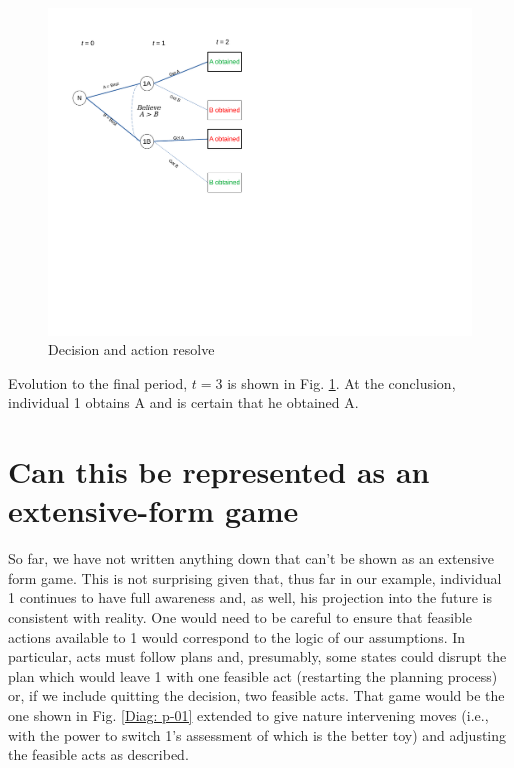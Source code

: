 \documentclass[
11pt,
titlepage,
reqno,
]{article}%
\theoremstyle{definition}
\begin{document}
\begin{figure}[h!]
	\centering
	\includegraphics*[page=8,trim = 0 2.5in 3in 0in,scale=.85]{Awareness_Diagrams_All}
	\caption{Decision and action resolve\label{Diag: p-08}}%
\end{figure}

Evolution to the final period, $t=3$ is shown in Fig. \ref{Diag: p-08}. At the conclusion, individual 1 obtains A and is certain that he obtained A. 

\section*{Can this be represented as an extensive-form game}

So far, we have not written anything down that can't be shown as an extensive form game. This is not surprising given that, thus far in our example, individual 1 continues to have full awareness and, as well, his projection into the future is consistent with reality. One would need to be careful to ensure that feasible actions available to 1 would correspond to the logic of our assumptions. In particular, acts must follow plans and, presumably, some states could disrupt the plan which would leave 1 with one feasible act (restarting the planning process) or, if we include quitting the decision, two feasible acts. That game would be the one shown in Fig. \ref{Diag: p-01} extended to give nature intervening moves (i.e., with the power to switch 1's assessment of which is the better toy) and adjusting the feasible acts as described.
\end{document}
